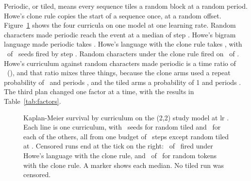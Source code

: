 \documentclass[10pt]{article}
\newcommand{\arm}[2]{(#1,#2)}
\let\periodsLong\nRangeLong
\renewcommand{\nRangeLong}{\mbox{\periodsLong}}
\let\periodsShort\nRangeShort
\renewcommand{\nRangeShort}{\mbox{\periodsShort}}
\begin{document}
Periodic, or tiled, means every sequence tiles a random block at a random period. Howe's clone rule copies the start of a sequence once, at a random offset. Figure~\ref{fig:survival} shows the four curricula on one model at one learning rate. Random characters made periodic reach the event at a median of step \nMedTwoTwoHi. Howe's bigram language made periodic takes \nMedBiTiled. Howe's language with the clone rule takes \nMedBiClone, with \nEvBiClone\ of \nNBiClone\ seeds fired by step \nBudgetBiClone. Random characters under the clone rule fired on \nEvUniClone\ of \nNUniClone. Howe's curriculum against random characters made periodic is a time ratio of \nCompound\ (\nCompoundCi), and that ratio mixes three things, because the clone arms used a repeat probability of \nPRepLow\ and periods \nRangeLong, and the tiled arms a probability of 1 and periods \nRangeShort. The third plan changed one factor at a time, with the results in Table~\ref{tab:factors}.

\begin{figure}[t]
\centering

\caption{Kaplan-Meier survival by curriculum on the \arm{2}{2} study model at lr \nLrHi. Each line is one curriculum, with \nNTwoTwoHi\ seeds for random tiled and \nNBiClone\ for each of the others, all from one budget of \nBudgetBiClone\ steps except random tiled at \nBudgetTwoTwoHi. Censored runs end at the tick on the right: \nEvBiClone\ of \nNBiClone\ fired under Howe's language with the clone rule, and \nEvUniClone\ of \nNUniClone\ for random tokens with the clone rule. A marker shows each median. No tiled run was censored.}
\label{fig:survival}
\end{figure}
\end{document}
